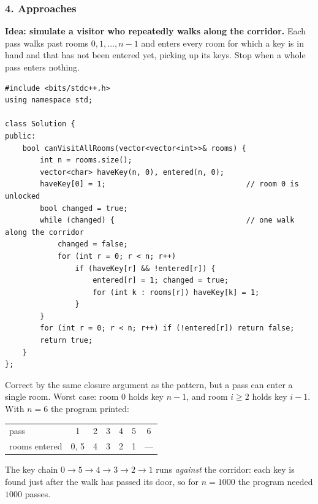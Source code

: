 \subsubsection*{4. Approaches}

\begin{bruteforcebox}
\textbf{Idea: simulate a visitor who repeatedly walks along the corridor.} Each pass walks past rooms $0, 1, \dots, n-1$ and enters every room for which a key is in hand and that has not been entered yet, picking up its keys. Stop when a whole pass enters nothing.

\begin{lstlisting}[style=cpp]
#include <bits/stdc++.h>
using namespace std;

class Solution {
public:
    bool canVisitAllRooms(vector<vector<int>>& rooms) {
        int n = rooms.size();
        vector<char> haveKey(n, 0), entered(n, 0);
        haveKey[0] = 1;                                // room 0 is unlocked
        bool changed = true;
        while (changed) {                              // one walk along the corridor
            changed = false;
            for (int r = 0; r < n; r++)
                if (haveKey[r] && !entered[r]) {
                    entered[r] = 1; changed = true;
                    for (int k : rooms[r]) haveKey[k] = 1;
                }
        }
        for (int r = 0; r < n; r++) if (!entered[r]) return false;
        return true;
    }
};
\end{lstlisting}

Correct by the same closure argument as the pattern, but a pass can enter a single room. Worst case: room 0 holds key $n{-}1$, and room $i \ge 2$ holds key $i{-}1$. With $n = 6$ the program printed:
\begin{center}\small
\begin{tabular}{@{}lcccccc@{}}
\toprule
pass & 1 & 2 & 3 & 4 & 5 & 6 \\
rooms entered & 0, 5 & 4 & 3 & 2 & 1 & --- \\
\bottomrule
\end{tabular}
\end{center}
\begin{center}
\end{center}
The key chain $0 \to 5 \to 4 \to 3 \to 2 \to 1$ runs \emph{against} the corridor: each key is found just after the walk has passed its door, so for $n = 1000$ the program needed $1000$ passes.


\end{bruteforcebox}
